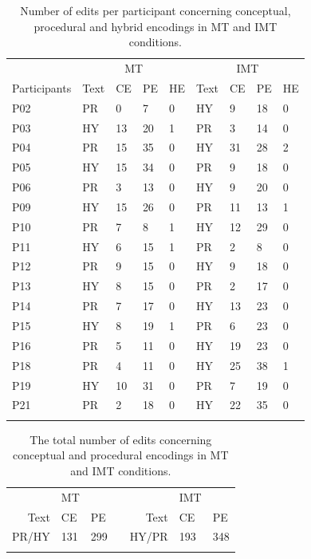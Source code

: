 \documentclass[output=paper]{langsci/langscibook}
\begin{document}
\begin{table}
\begin{tabular}{lllllllll}
\lsptoprule 
& \multicolumn{4}{c}{MT} & \multicolumn{4}{c}{IMT} \\
Participants & Text & CE & PE & HE & Text & CE & PE & HE \\
\midrule
P02 & PR & 0 & 7 & 0  & HY & 9 & 18 & 0\\
P03 & HY & 13 & 20 & 1  & PR & 3 & 14 & 0\\
P04 & PR & 15 & 35 & 0  & HY & 31 & 28 & 2\\
P05 & HY & 15 & 34 & 0  & PR & 9 & 18 & 0\\
P06 & PR & 3 & 13 & 0  & HY & 9 & 20 & 0\\
P09 & HY & 15 & 26 & 0  & PR & 11 & 13 & 1\\
P10 & PR & 7 & 8 & 1  & HY & 12 & 29 & 0\\
P11 & HY & 6 & 15 & 1  & PR & 2 & 8 & 0\\
P12 & PR & 9 & 15 & 0  & HY & 9 & 18 & 0\\
P13 & HY & 8 & 15 & 0  & PR & 2 & 17 & 0\\
P14 & PR & 7 & 17 & 0  & HY & 13 & 23 & 0\\
P15 & HY & 8 & 19 & 1  & PR & 6 & 23 & 0\\
P16 & PR & 5 & 11 & 0  & HY & 19 & 23 & 0\\
P18 & PR & 4 & 11 & 0  & HY & 25 & 38 & 1\\
P19 & HY & 10 & 31 & 0  & PR & 7 & 19 & 0\\
P21 & PR & 2 & 18 & 0  & HY & 22 & 35 & 0\\
\lspbottomrule
\end{tabular}
\caption{Number of edits per participant concerning conceptual, procedural and hybrid encodings in MT and IMT conditions.}
\label{tab:1}
\end{table}

\begin{table}
\begin{tabular}{rllcrll}
\lsptoprule
{~} & {MT} & ~ && {~} & {IMT} & ~\\
Text & CE & PE && Text & CE & PE\\
\midrule
PR/HY & 131 & 299 && HY/PR & 193 & 348\\
\lspbottomrule
\end{tabular}
\caption{The total number of edits concerning conceptual and procedural encodings in MT and IMT conditions.}
\label{tab:2}
\end{table}
\end{document}
